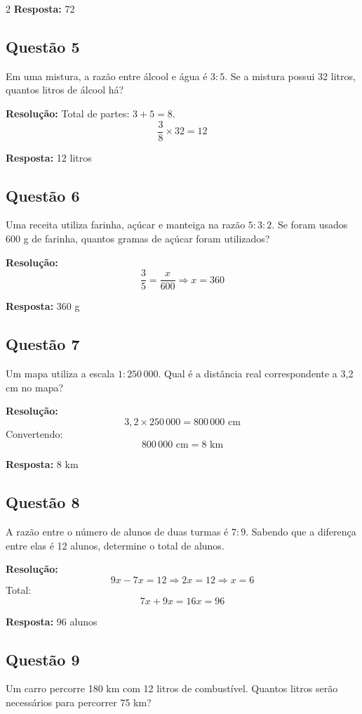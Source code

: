\documentclass[11pt]{article}
\begin{document}
\begin{multicols}{2}
\textbf{Resposta:} 72

\subsection*{Questão 5}
Em uma mistura, a razão entre álcool e água é $3:5$. Se a mistura possui 32 litros, quantos litros de álcool há?

\textbf{Resolução:}
Total de partes: $3 + 5 = 8$.
\[
\frac{3}{8} \times 32 = 12
\]

\textbf{Resposta:} 12 litros

\subsection*{Questão 6}
Uma receita utiliza farinha, açúcar e manteiga na razão $5:3:2$. Se foram usados 600 g de farinha, quantos gramas de açúcar foram utilizados?

\textbf{Resolução:}
\[
\frac{3}{5} = \frac{x}{600}
\Rightarrow x = 360
\]

\textbf{Resposta:} 360 g

\subsection*{Questão 7}
Um mapa utiliza a escala $1:250\,000$. Qual é a distância real correspondente a 3,2 cm no mapa?

\textbf{Resolução:}
\[
3{,}2 \times 250\,000 = 800\,000 \text{ cm}
\]
Convertendo:
\[
800\,000 \text{ cm} = 8 \text{ km}
\]

\textbf{Resposta:} 8 km

\subsection*{Questão 8}
A razão entre o número de alunos de duas turmas é $7:9$. Sabendo que a diferença entre elas é 12 alunos, determine o total de alunos.

\textbf{Resolução:}
\[
9x - 7x = 12 \Rightarrow 2x = 12 \Rightarrow x = 6
\]
Total:
\[
7x + 9x = 16x = 96
\]

\textbf{Resposta:} 96 alunos

\subsection*{Questão 9}
Um carro percorre 180 km com 12 litros de combustível. Quantos litros serão necessários para percorrer 75 km?


\end{multicols}
\end{document}
